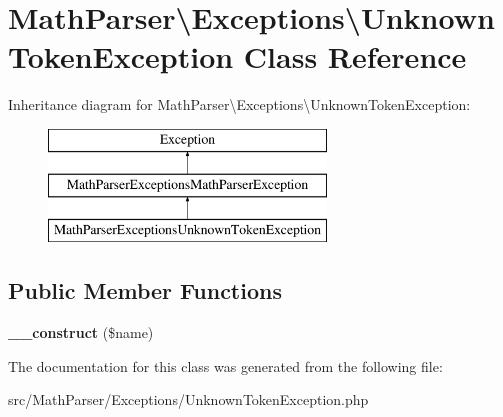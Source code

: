 \hypertarget{classMathParser_1_1Exceptions_1_1UnknownTokenException}{\section{Math\-Parser\textbackslash{}Exceptions\textbackslash{}Unknown\-Token\-Exception Class Reference}
\label{classMathParser_1_1Exceptions_1_1UnknownTokenException}
}
Inheritance diagram for Math\-Parser\textbackslash{}Exceptions\textbackslash{}Unknown\-Token\-Exception\-:\begin{figure}[H]
\begin{center}
\leavevmode
\includegraphics[height=3.000000cm]{classMathParser_1_1Exceptions_1_1UnknownTokenException}
\end{center}
\end{figure}
\subsection*{Public Member Functions}
\begin{DoxyCompactItemize}
\item 
\hypertarget{classMathParser_1_1Exceptions_1_1UnknownTokenException_a8a13ad3d7528b40fc89dbf25d7943988}{{\bfseries \-\_\-\-\_\-construct} (\$name)}\label{classMathParser_1_1Exceptions_1_1UnknownTokenException_a8a13ad3d7528b40fc89dbf25d7943988}

\end{DoxyCompactItemize}


The documentation for this class was generated from the following file\-:\begin{DoxyCompactItemize}
\item 
src/\-Math\-Parser/\-Exceptions/Unknown\-Token\-Exception.\-php\end{DoxyCompactItemize}
